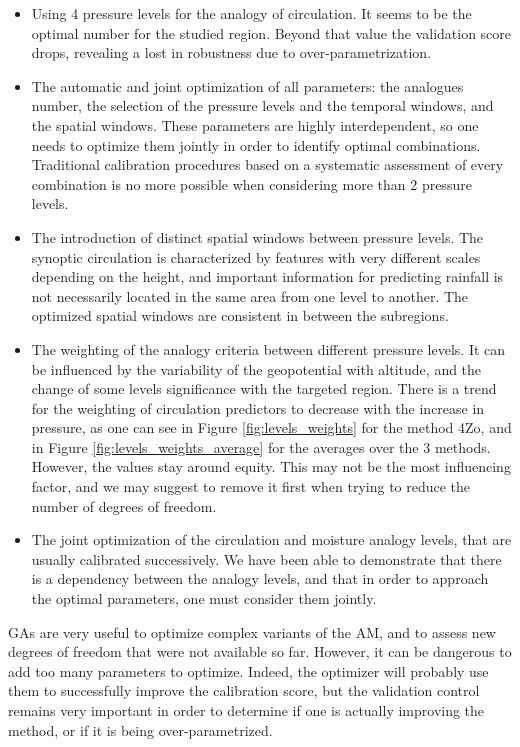 \documentclass[5p]{elsarticle}
\begin{document}
\begin{itemize}
	\item Using 4 pressure levels for the analogy of circulation. It seems to be the optimal number for the studied region. Beyond that value the validation score drops, revealing a lost in robustness due to over-parametrization.
	\item The automatic and joint optimization of all parameters: the analogues number, the selection of the pressure levels and the temporal windows, and the spatial windows. These parameters are highly interdependent, so one needs to optimize them jointly in order to identify optimal combinations. Traditional calibration procedures based on a systematic assessment of every combination is no more possible when considering more than 2 pressure levels.
	\item The introduction of distinct spatial windows between pressure levels. The synoptic circulation is characterized by features with very different scales depending on the height, and important information for predicting rainfall is not necessarily located in the same area from one level to another. The optimized spatial windows are consistent in between the subregions.
	\item The weighting of the analogy criteria between different pressure levels. It can be influenced by the variability of the geopotential with altitude, and the change of some levels significance with the targeted region. There is a trend for the weighting of circulation predictors to decrease with the increase in pressure, as one can see in Figure \ref{fig:levels_weights} for the method 4Zo, and in Figure \ref{fig:levels_weights_average} for the averages over the 3 methods. However, the values stay around equity. This may not be the most influencing factor, and we may suggest to remove it first when trying to reduce the number of degrees of freedom.
	\item The joint optimization of the circulation and moisture analogy levels, that are usually calibrated successively. We have been able to demonstrate that there is a dependency between the analogy levels, and that in order to approach the optimal parameters, one must consider them jointly.
\end{itemize}


GAs are very useful to optimize complex variants of the AM, and to assess new degrees of freedom that were not available so far. However, it can be dangerous to add too many parameters to optimize. Indeed, the optimizer will probably use them to successfully improve the calibration score, but the validation control remains very important in order to determine if one is actually improving the method, or if it is being over-parametrized.
\end{document}

